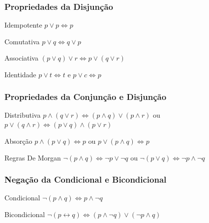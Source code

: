 \documentclass{beamer}
\begin{document}
\begin{frame}
\frametitle{Propriedades da Disjunção}

\begin{block}{Idempotente}
	$p \vee p \Leftrightarrow p$
\end{block}\vfill

\begin{block}{Comutativa}
	$p \vee q \Leftrightarrow q \vee p$
\end{block}\vfill

\begin{block}{Associativa}
	$(p \vee q) \vee r \Leftrightarrow p \vee (q \vee r)$
\end{block}\vfill

\begin{block}{Identidade}
	$p \vee t \Leftrightarrow t$ e $p \vee c \Leftrightarrow p$
\end{block}\vfill

\end{frame}

\begin{frame}
\frametitle{Propriedades da Conjunção e Disjunção}

\begin{block}{Distributiva}
$p \wedge (q \vee r) \Leftrightarrow (p \wedge q) \vee (p \wedge r)$ ou $p \vee (q \wedge r) \Leftrightarrow (p \vee q) \wedge (p \vee r)$
\end{block}\vfill

\begin{block}{Absorção}
$p \wedge (p \vee q) \Leftrightarrow p$ ou $p \vee (p \wedge q) \Leftrightarrow p$
\end{block}\vfill

\begin{block}{Regras De Morgan}
$\neg (p \wedge q) \Leftrightarrow \neg p \vee \neg q$ ou $\neg (p \vee q) \Leftrightarrow \neg p \wedge \neg q$
\end{block}
\end{frame}

\begin{frame}
\frametitle{Negação da Condicional e Bicondicional}

\begin{block}{Condicional}
$\neg (p \wedge q) \Leftrightarrow p \wedge \neg q$
\end{block}\vfill

\begin{block}{Bicondicional}
$\neg (p \leftrightarrow q) \Leftrightarrow (p \wedge \neg q) \vee (\neg p \wedge q)$
\end{block}
\end{frame}
\end{document}
